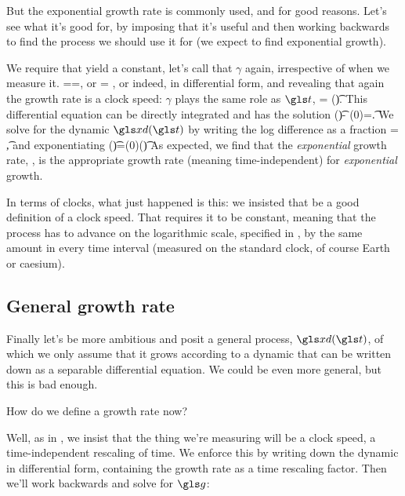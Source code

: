But the exponential growth rate is commonly used, and for good reasons. Let's see what it's good for, by imposing that it's useful and then working backwards to find the process we should use it for (we expect to find exponential growth).

We require that  yield a constant, let's call that $\gamma$ again, irrespective of when we measure it.
\be
 \gexp=\frac{\D \ln \xd}{\Dt}=\gamma,
\ee
or
\be
\D \ln \xd = \gamma\Dt,
\ee
or indeed, in differential form, and revealing that again the growth rate is a clock speed: $\gamma$ plays the same role as $\t$,
\be
\gd\ln \xd = \gd(\gamma \t).
\ee
This differential equation can be directly integrated and has the solution
\be
\ln \xd(\t)- \ln \xd(0)=\gamma \t.
\ee
We solve for the dynamic $\xd(\t)$ by writing the log difference as a fraction
\be
\ln {} = \gamma \t ,
\ee
and exponentiating
\be
\xd(\t)=\xd(0)\exp(\gamma \t)
\ee
As expected, we find that the {\it exponential} growth rate, , is the appropriate 
growth rate (meaning time-independent) for {\it exponential} growth.

In terms of clocks, what just happened is this: we insisted that  be a good 
definition of a clock speed. That requires it to be constant, meaning that the process has 
to advance on the logarithmic scale, specified in , by the same amount in 
every time interval (measured on the standard clock, of course Earth or caesium).


\subsection{General growth rate}

Finally let's be more ambitious and posit a general process, $\xd(\t)$, of which we only assume that it grows according to a dynamic that can be written down as a separable differential equation. We could be even more general, but this is bad enough.

How do we define a growth rate now?

Well, as in , we insist that the thing we're measuring will be a clock speed, \ie a time-independent rescaling of time. 
We enforce this by writing down the dynamic in differential form, containing the growth rate as a time 
rescaling factor. Then we'll work backwards and solve for $\g$:

